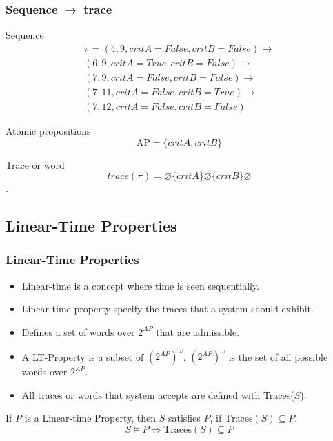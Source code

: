 \documentclass{beamer}
\begin{document}
\begin{frame}
  \frametitle{Sequence $\rightarrow$ trace}
  \begin{block}{Sequence}
        \begin{equation*}
  \label{eq:path}
  \begin{split}
\pi=(4,9,critA=False,critB=False) \rightarrow \\
(6, 9, critA=True,critB=False) \rightarrow \\
(7, 9, critA=False,critB=False) \rightarrow \\
(7,11,critA=False,critB=True) \rightarrow \\
(7,12,critA=False,critB=False)
  \end{split}
\end{equation*}    
  \end{block}

  \begin{block}{Atomic propositions}
    \[
\text{AP}=\{critA, critB\}
\]
  \end{block}
  \begin{block}{Trace or word}
\[
trace(\pi) = \varnothing \{critA\} \varnothing \{critB\} \varnothing
\].
  \end{block}
\end{frame}
\subsection{Linear-Time Properties}

\begin{frame}
  \frametitle{Linear-Time Properties}
    \begin{itemize}
    \item Linear-time is a concept where time is seen sequentially.
    \item Linear-time property specify the traces that a system should exhibit.
\item Defines a set of words over $2^{AP}$ that are admissible.
\item A LT-Property is a subset of $(2^{AP})^{\omega}$. $(2^{AP})^{\omega}$ is the set of all possible words over $2^{AP}$.
    \item  All traces or words that system accepts are defined with Traces($S$).
    \end{itemize}
If $P$ is a Linear-time Property, then $S$ satisfies $P$, if $\text{Traces}(S) \subseteq P$. 
\[
S \models P \iff \text{Traces}(S) \subseteq P 
\]

\end{frame}
\end{document}
